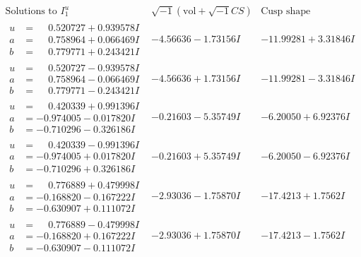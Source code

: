 \documentclass[1p]{elsarticle_modified}
\theoremstyle{definition}
\newcommand{\I}{\sqrt{-1}}
\begin{document}
$$\begin{array}{c|c|c}  
\text{Solutions to }I^u_{1}& \I (\text{vol} + \sqrt{-1}CS) & \text{Cusp shape}\\
 \hline 
\begin{aligned}
u &= \phantom{-}0.520727 + 0.939578 I \\
a &= \phantom{-}0.758964 + 0.066469 I \\
b &= \phantom{-}0.779771 + 0.243421 I\end{aligned}
 & -4.56636 - 1.73156 I & -11.99281 + 3.31846 I \\ \hline\begin{aligned}
u &= \phantom{-}0.520727 - 0.939578 I \\
a &= \phantom{-}0.758964 - 0.066469 I \\
b &= \phantom{-}0.779771 - 0.243421 I\end{aligned}
 & -4.56636 + 1.73156 I & -11.99281 - 3.31846 I \\ \hline\begin{aligned}
u &= \phantom{-}0.420339 + 0.991396 I \\
a &= -0.974005 - 0.017820 I \\
b &= -0.710296 - 0.326186 I\end{aligned}
 & -0.21603 - 5.35749 I & -6.20050 + 6.92376 I \\ \hline\begin{aligned}
u &= \phantom{-}0.420339 - 0.991396 I \\
a &= -0.974005 + 0.017820 I \\
b &= -0.710296 + 0.326186 I\end{aligned}
 & -0.21603 + 5.35749 I & -6.20050 - 6.92376 I \\ \hline\begin{aligned}
u &= \phantom{-}0.776889 + 0.479998 I \\
a &= -0.168820 - 0.167222 I \\
b &= -0.630907 + 0.111072 I\end{aligned}
 & -2.93036 - 1.75870 I & -17.4213 + 1.7562 I \\ \hline\begin{aligned}
u &= \phantom{-}0.776889 - 0.479998 I \\
a &= -0.168820 + 0.167222 I \\
b &= -0.630907 - 0.111072 I\end{aligned}
 & -2.93036 + 1.75870 I & -17.4213 - 1.7562 I \\ \hline\begin{aligned}

\end{aligned}
\end{array}$$
\end{document}
